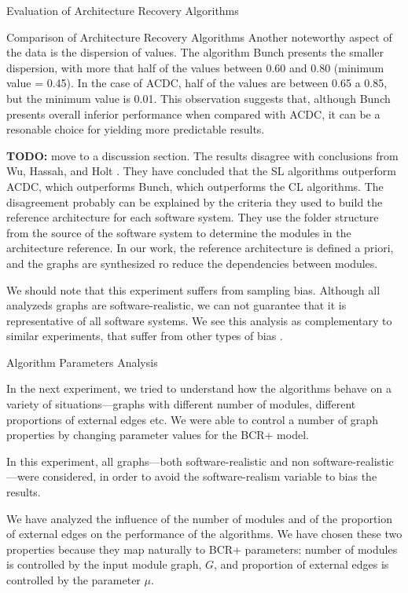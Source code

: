 \documentclass[11pt,twocolumn,a4paper,english]{article}
\newcommand{\TODO}{\textbf{TODO:} }
\begin{document}
\begin{section}{Evaluation of Architecture Recovery Algorithms}
\begin{subsection}{Comparison of Architecture Recovery Algorithms}
	Another noteworthy aspect of the data is the dispersion of values. The algorithm Bunch presents the smaller dispersion, with more that half of the values between 0.60 and 0.80 (minimum value = 0.45). In the case of ACDC, half of the values are between 0.65 a 0.85, but the minimum value is 0.01. This observation suggests that, although Bunch presents overall inferior performance when compared with ACDC, it can be a resonable choice for yielding more predictable results.
	
	\TODO move to a discussion section.
	The results disagree with conclusions from Wu, Hassah, and Holt \cite{Wu2005}. They have concluded that the SL algorithms outperform ACDC, which outperforms Bunch, which outperforms the CL algorithms. The disagreement probably can be explained by the criteria they used to build the reference architecture for each software system. They use the folder structure from the source of the software system to determine the modules in the architecture reference. In our work, the reference architecture is defined a priori, and the graphs are synthesized ro reduce the dependencies between modules.
	
	We should note that this experiment suffers from sampling bias. Although all analyzeds graphs are software-realistic, we can not guarantee that it is representative of all software systems. We see this analysis as complementary to similar experiments, that suffer from other types of bias \cite{Wu2005,Bittencourt2009,Andritsos2005}.
	
\end{subsection}	

\begin{subsection}{Algorithm Parameters Analysis}
	
	In the next experiment, we tried to understand how the algorithms behave on a variety of situations---graphs with different number of modules, different proportions of external edges etc. We were able to control a number of graph properties by changing parameter values for the BCR+ model.
	
	In this experiment, all graphs---both software-realistic and non software-realistic---were considered, in order to avoid the software-realism variable to bias the results.
	
	We have analyzed the influence of the number of modules and of the proportion of external edges on the performance of the algorithms. We have chosen these two properties because they map naturally to BCR+ parameters: number of modules is controlled by the input module graph, $G$, and proportion of external edges is controlled by the parameter $\mu$.


\end{subsection}
\end{section}
\end{document}
